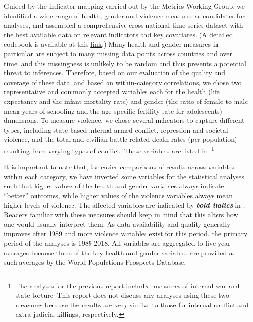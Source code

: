 \documentclass[12pt]{article}
\begin{document}
Guided by the indicator mapping carried out by the Metrics Working Group, we identified a wide range of health, gender and violence measures as candidates for analyses, and assembled a comprehensive cross-national time-series dataset with the best available data on relevant indicators and key covariates. (A detailed codebook is available at this \href{https://docs.google.com/spreadsheets/d/1KLFTva--XHVBM-IX6qaPtuyzmIlRMnpyjUXfBdJPsag/edit?usp=sharing}{link}.)
Many health and gender measures in particular are subject to many missing data points across countries and over time, and this missingness is unlikely to be random and thus presents a potential threat to inferences. Therefore, based on our evaluation of the quality and coverage of these data, and based on within-category correlations, we chose two representative and commonly accepted variables each for the health (life expectancy and the infant mortality rate) and gender (the ratio of female-to-male mean years of schooling and the age-specific fertility rate for adolescents) dimensions.
To measure violence, we chose several indicators to capture different types, including state-based internal armed conflict, repression and societal violence, and the total and civilian battle-related death rates (per population) resulting from varying types of conflict.
These variables are listed in .\footnote{The analyses for the previous report included measures of internal war and state torture. This report does not discuss any analyses using these two measures because the results are very similar to those for internal conflict and extra-judicial killings, respectively.}



It is important to note that, for easier comparisons of results across variables within each category, we have inverted some variables for the statistical analyses such that higher values of the health and gender variables always indicate \enquote{better} outcomes, while higher values of the violence variables always mean higher levels of violence. The affected variables are indicated by \textbf{\textit{bold italics}} in . Readers familiar with these measures should keep in mind that this alters how one would usually interpret them.
As data availability and quality generally improves after 1989 and more violence variables exist for this period, the primary period of the analyses is 1989-2018. All variables are aggregated to five-year averages because three of the key health and gender variables are provided as such averages by the World Populations Prospects Database.
\end{document}
